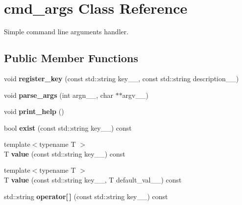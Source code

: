 \hypertarget{classcmd__args}{}\section{cmd\+\_\+args Class Reference}
\label{classcmd__args}


Simple command line arguments handler.  


\subsection*{Public Member Functions}
\begin{DoxyCompactItemize}
\item 
\hypertarget{classcmd__args_a1999fa1af85517f60a5624db083b48de}{}void {\bfseries register\+\_\+key} (const std\+::string key\+\_\+\+\_\+, const std\+::string description\+\_\+\+\_\+)\label{classcmd__args_a1999fa1af85517f60a5624db083b48de}

\item 
\hypertarget{classcmd__args_aa2ee646ccdc1f9716779fa3ab429531a}{}void {\bfseries parse\+\_\+args} (int argn\+\_\+\+\_\+, char $\ast$$\ast$argv\+\_\+\+\_\+)\label{classcmd__args_aa2ee646ccdc1f9716779fa3ab429531a}

\item 
\hypertarget{classcmd__args_abbed3d1d73451ecf71e314caf3b38f1c}{}void {\bfseries print\+\_\+help} ()\label{classcmd__args_abbed3d1d73451ecf71e314caf3b38f1c}

\item 
\hypertarget{classcmd__args_adb8e20837ea6ec7fd3ec399ad0ed43de}{}bool {\bfseries exist} (const std\+::string key\+\_\+\+\_\+) const \label{classcmd__args_adb8e20837ea6ec7fd3ec399ad0ed43de}

\item 
\hypertarget{classcmd__args_a7fbcc8a59acdf894666352696e103083}{}{\footnotesize template$<$typename T $>$ }\\T {\bfseries value} (const std\+::string key\+\_\+\+\_\+) const \label{classcmd__args_a7fbcc8a59acdf894666352696e103083}

\item 
\hypertarget{classcmd__args_ac7f5f1c75757750a2a831f181bc17bb9}{}{\footnotesize template$<$typename T $>$ }\\T {\bfseries value} (const std\+::string key\+\_\+\+\_\+, T default\+\_\+val\+\_\+\+\_\+) const \label{classcmd__args_ac7f5f1c75757750a2a831f181bc17bb9}

\item 
\hypertarget{classcmd__args_af5539c76a23c7f16402320901c4f41ca}{}std\+::string {\bfseries operator\mbox{[}$\,$\mbox{]}} (const std\+::string key\+\_\+\+\_\+) const \label{classcmd__args_af5539c76a23c7f16402320901c4f41ca}


\end{DoxyCompactItemize}
